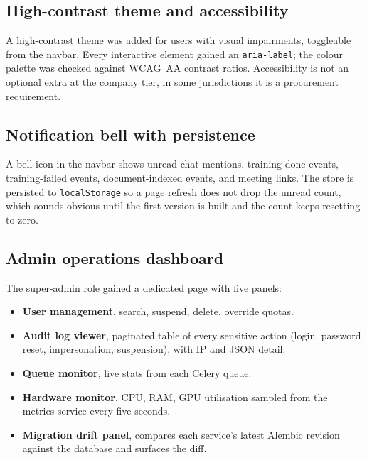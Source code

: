 \documentclass[12pt, a4paper, oneside]{report}
\begin{document}

\subsection{High-contrast theme and accessibility}

A high-contrast theme was added for users with visual impairments,
toggleable from the navbar. Every interactive element gained an
\texttt{aria-label}; the colour palette was checked against WCAG~AA
contrast ratios. Accessibility is not an optional extra at the
company tier, in some jurisdictions it is a procurement
requirement.

\subsection{Notification bell with persistence}

A bell icon in the navbar shows unread chat mentions, training-done
events, training-failed events, document-indexed events, and meeting
links. The store is persisted to \texttt{localStorage} so a page
refresh does not drop the unread count, which sounds obvious until
the first version is built and the count keeps resetting to zero.

\subsection{Admin operations dashboard}

The super-admin role gained a dedicated page with five panels:

\begin{itemize}
    \item \textbf{User management}, search, suspend, delete,
        override quotas.
    \item \textbf{Audit log viewer}, paginated table of every
        sensitive action (login, password reset, impersonation,
        suspension), with IP and JSON detail.
    \item \textbf{Queue monitor}, live stats from each Celery
        queue.
    \item \textbf{Hardware monitor}, CPU, RAM, GPU utilisation
        sampled from the metrics-service every five seconds.
    \item \textbf{Migration drift panel}, compares each
        service's latest Alembic revision against the database and
        surfaces the diff.
\end{itemize}
\end{document}
